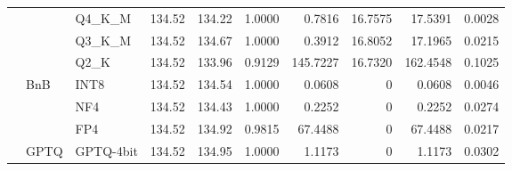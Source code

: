 \begin{longtable}{ll l rrrrrrr}
 &  & Q4\_K\_M & 134.52 & 134.22 & 1.0000 & 0.7816 & 16.7575 & 17.5391 & 0.0028 \\
 &  & Q3\_K\_M & 134.52 & 134.67 & 1.0000 & 0.3912 & 16.8052 & 17.1965 & 0.0215 \\
 &  & Q2\_K & 134.52 & 133.96 & \cellcolor{red!18} 0.9129 & \cellcolor{red!18} 145.7227 & 16.7320 & \cellcolor{red!18} 162.4548 & \cellcolor{red!18} 0.1025 \\
 & BnB & INT8 & 134.52 & 134.54 & 1.0000 & 0.0608 & \cellcolor{cyan!12} $0$ & 0.0608 & 0.0046 \\
 &  & NF4 & 134.52 & 134.43 & 1.0000 & 0.2252 & \cellcolor{cyan!12} $0$ & 0.2252 & 0.0274 \\
 &  & FP4 & 134.52 & 134.92 & 0.9815 & 67.4488 & \cellcolor{cyan!12} $0$ & 67.4488 & 0.0217 \\
 & GPTQ & GPTQ-4bit & 134.52 & 134.95 & 1.0000 & 1.1173 & \cellcolor{cyan!12} $0$ & 1.1173 & 0.0302 \\
\end{longtable}
\endgroup